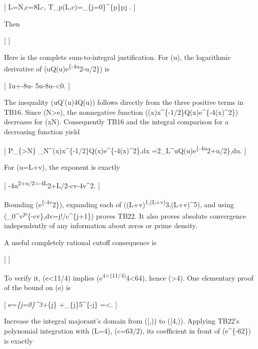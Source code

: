 \documentclass[
]{article}
\begin{document}
{[} L=\log N,\quad c=8L-, \quad
\mathcal T\_p(L,c)=\sum\_\{j=0\}\^{}\{p\}\binom pj
.  {]}

Then

{[}   {]}

Here is the complete sum-to-integral justification. For (u), the
logarithmic derivative of (uQ(u)e\textsuperscript{\{-4u}2-u/2\}) is

{[} \frac1u+-8u-
\le\frac5u-8u-\textless0. {]}

The inequality (uQ'(u)\le4Q(u)) follows directly from the three positive
terms in TB16. Since (N\textgreater e), the nonnegative function
((\log x)x\^{}\{-1/2\}Q(\log x)e\^{}\{-4(\log x)\^{}2\}) decreases for
(x\ge N). Consequently TB16 and the integral comparison for a decreasing
function yield

{[} \textbar P\_\{\textgreater N\}\textbar{}
\int\_N\^{}\infty(\log x)x\^{}\{-1/2\}Q(\log x)e\^{}\{-4(\log x)\^{}2\},dx
=2\int\_L\^{}\infty uQ(u)e\textsuperscript{\{-4u}2+u/2\},du. {]}

For (u=L+v), the exponent is exactly

{[} -4u\textsuperscript{2+u/2=-4L}2+L/2-cv-4v\^{}2. {]}

Bounding (e\textsuperscript{\{-4v}2\}), expanding each of
((L+v)\textsuperscript{1,(L+v)}3,(L+v)\^{}5), and using
(\int\_0\^{}\infty v\textsuperscript{je}\{-cv\},dv=j!/c\^{}\{j+1\})
proves TB22. It also proves absolute convergence independently of any
information about zeros or prime density.

A useful completely rational cutoff consequence is

{[}   {]}

To verify it, (e\textless11/4) implies
(e\textsuperscript{4\textless(11/4)}4\textless64), hence
(\textgreater4). One elementary proof of the bound on (e) is

{[} e=\sum\emph{\{j=0\}\^{}3+\sum}\{j\}
\le{}+\sum\_\{j\}5\^{}\{-j\}
=\textless{}. {]}

Increase the integral majorant's domain from ({[},\infty)) to
({[}4,\infty)). Applying TB22's polynomial integration with (L=4),
(c=63/2), its coefficient in front of (e\^{}\{-62\}) is exactly
\end{document}
